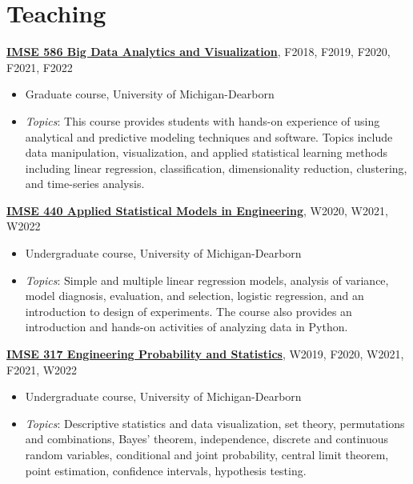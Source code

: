 \documentclass[11pt]{article}
\newenvironment{main}
{\begin{adjustwidth}{3em}{}}
{\end{adjustwidth}}
\begin{document}
\section*{Teaching}
\begin{main}

\textbf{\href{https://imse586.github.io/}{IMSE 586 Big Data Analytics and Visualization}}, F2018, F2019, F2020, F2021, F2022

\begin{itemize}
    \item[] Graduate course, University of Michigan-Dearborn 
    \item[] \textit{Topics}: This course provides students with hands-on experience of using analytical and predictive modeling techniques and software. Topics include data manipulation, visualization, and applied statistical learning methods including linear regression, classification, dimensionality reduction, clustering, and time-series analysis. 
\end{itemize}


\textbf{\href{https://imse440.github.io/}{IMSE 440 Applied Statistical Models in Engineering}}, W2020, W2021, W2022

\begin{itemize}
    \item[] Undergraduate course, University of Michigan-Dearborn
    \item[] \textit{Topics}: Simple and multiple linear regression models, analysis of variance, model diagnosis, evaluation, and selection, logistic regression, and an introduction to design of experiments. The course also provides an introduction and hands-on activities of analyzing data in Python.
\end{itemize}


\textbf{\href{https://imse317.github.io/}{IMSE 317 Engineering Probability and Statistics}}, W2019, F2020, W2021, F2021, W2022

\begin{itemize}
    \item[] Undergraduate course, University of Michigan-Dearborn
    \item[] \textit{Topics}: Descriptive statistics and data visualization, set theory, permutations and combinations, Bayes’ theorem, independence, discrete and continuous random variables, conditional and joint probability, central limit theorem, point estimation, confidence intervals, hypothesis testing. 
\end{itemize}



\end{main}
\end{document}
